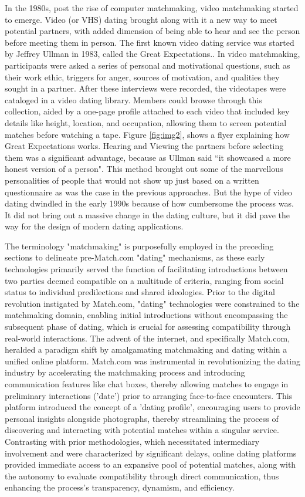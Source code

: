 In the 1980s, post the rise of computer matchmaking, video matchmaking started to emerge. Video (or VHS) dating brought along with it a new way to meet potential partners, with added dimension of being able to hear and see the person before meeting them in person. The first known video dating service was started by Jeffrey Ullman in 1983, called the Great Expectations.\cite{waters_how_2021}. In video matchmaking, participants were asked a series of personal and motivational questions, such as their work ethic, triggers for anger, sources of motivation, and qualities they sought in a partner. After these interviews were recorded, the videotapes were cataloged in a video dating library. Members could browse through this collection, aided by a one-page profile attached to each video that included key details like height, location, and occupation, allowing them to screen potential matches before watching a tape. Figure \ref{fig:img2}, shows a flyer explaining how Great Expectations works. Hearing and Viewing the partners before selecting them was a significant advantage, because as Ullman said ``it showcased a more honest version of a person". \cite{waters_how_2021} This method brought out some of the marvellous personalities of people that would not show up just based on a written questionnaire as was the case in the previous approaches. But the hype of video dating dwindled in the early 1990s because of how cumbersome the process was. It did not bring out a massive change in the dating culture, but it did pave the way for the design of modern dating applications. 

The terminology "matchmaking" is purposefully employed in the preceding sections to delineate pre-Match.com "dating" mechanisms, as these early technologies primarily served the function of facilitating introductions between two parties deemed compatible on a multitude of criteria, ranging from social status to individual predilections and shared ideologies. Prior to the digital revolution instigated by Match.com, "dating" technologies were constrained to the matchmaking domain, enabling initial introductions without encompassing the subsequent phase of dating, which is crucial for assessing compatibility through real-world interactions. The advent of the internet, and specifically Match.com, heralded a paradigm shift by amalgamating matchmaking and dating within a unified online platform. Match.com was instrumental in revolutionizing the dating industry by accelerating the matchmaking process and introducing communication features like chat boxes, thereby allowing matches to engage in preliminary interactions ('date') prior to arranging face-to-face encounters.\cite{noauthor_dating_nodate} This platform introduced the concept of a 'dating profile', encouraging users to provide personal insights alongside photographs, thereby streamlining the process of discovering and interacting with potential matches within a singular service. Contrasting with prior methodologies, which necessitated intermediary involvement and were characterized by significant delays, online dating platforms provided immediate access to an expansive pool of potential matches, along with the autonomy to evaluate compatibility through direct communication, thus enhancing the process's transparency, dynamism, and efficiency.

